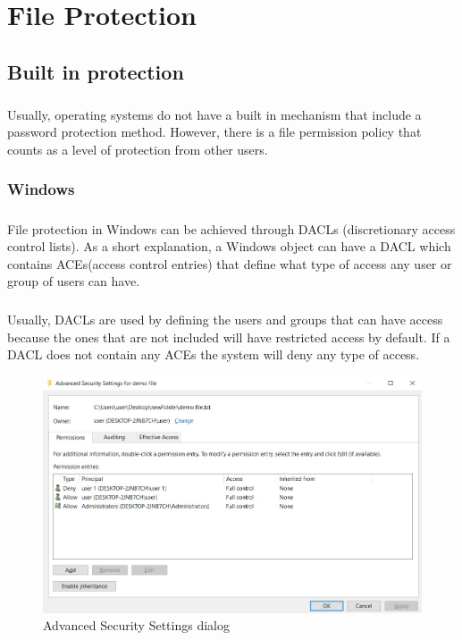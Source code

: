 	\chapter{File Protection}
	\section{Built in protection}
	\paragraph{}
	Usually, operating systems do not have a built in mechanism that include a password protection method. However, there is a file permission policy that counts as a level of protection from other users.
	
	\subsection{Windows}
	\paragraph{}
	File protection in Windows can be achieved through DACLs (discretionary access control lists). As a short explanation, a Windows object can have a DACL which contains ACEs(access control entries) that define what type of access any user or group of users can have\cite{MDSNDACsLACEs}.
	
	\paragraph{}
	Usually, DACLs are used by defining the users and groups that can have access because the ones that are not included will have restricted access by default. If a DACL does not contain any ACEs the system will deny any type of access.
	
	\begin{figure}[h!]
		\includegraphics[width=\linewidth]{images/securitySettings.jpg}
		\caption{Advanced Security Settings dialog}
		\label{fig:securitySettings}
	\end{figure}
	
